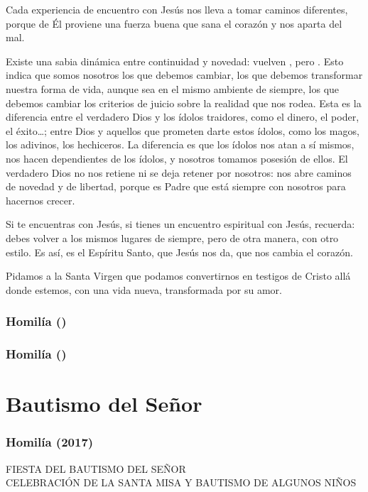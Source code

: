 Cada experiencia de encuentro con Jesús nos lleva a tomar caminos diferentes, porque de Él proviene una fuerza buena que sana el corazón y nos aparta del mal.

Existe una sabia dinámica entre continuidad y novedad: vuelven , pero . Esto indica que somos nosotros los que debemos cambiar, los que debemos transformar nuestra forma de vida, aunque sea en el mismo ambiente de siempre, los que debemos cambiar los criterios de juicio sobre la realidad que nos rodea. Esta es la diferencia entre el verdadero Dios y los ídolos traidores, como el dinero, el poder, el éxito\ldots{}; entre Dios y aquellos que prometen darte estos ídolos, como los magos, los adivinos, los hechiceros. La diferencia es que los ídolos nos atan a sí mismos, nos hacen dependientes de los ídolos, y nosotros tomamos posesión de ellos. El verdadero Dios no nos retiene ni se deja retener por nosotros: nos abre caminos de novedad y de libertad, porque es Padre que está siempre con nosotros para hacernos crecer.

Si te encuentras con Jesús, si tienes un encuentro espiritual con Jesús, recuerda: debes volver a los mismos lugares de siempre, pero de otra manera, con otro estilo. Es así, es el Espíritu Santo, que Jesús nos da, que nos cambia el corazón.

Pidamos a la Santa Virgen que podamos convertirnos en testigos de Cristo allá donde estemos, con una vida nueva, transformada por su amor.



\subsubsection{Homilía ()}

\subsubsection{Homilía ()}

\section{Bautismo del Señor} \subsubsection{Homilía (2017)} FIESTA DEL BAUTISMO DEL SEÑOR\\ CELEBRACIÓN DE LA SANTA MISA Y BAUTISMO DE ALGUNOS NIÑOS


